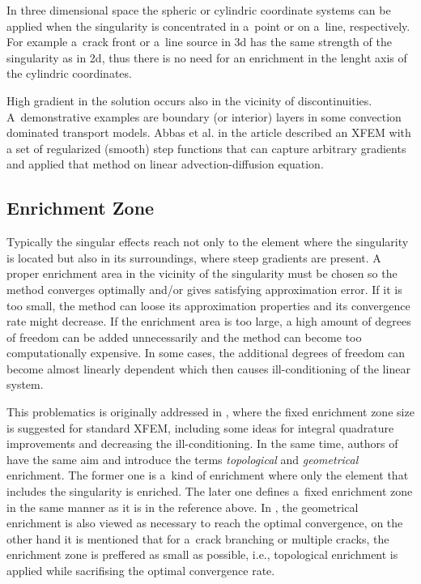 In three dimensional space the spheric or cylindric coordinate systems can be applied when the singularity is concentrated in a~point or on a~line, respectively.
For example a~crack front or a~line source in 3d has the same strength of the singularity as in 2d, thus there is no need for an enrichment in the lenght axis
of the cylindric coordinates.

High gradient in the solution occurs also in the vicinity of discontinuities. A~demonstrative examples are boundary (or interior) layers
in some convection dominated transport models. Abbas et al. in the article \cite{abbas_alizada_fries_highgradient_2010} described an XFEM with
a set of regularized (smooth) step functions that can capture arbitrary gradients and applied that method on linear advection-diffusion equation.

\subsection{Enrichment Zone} \label{sec:glob_enr_zone}
Typically the singular effects reach not only to the element where the singularity is located but also in its surroundings,
where steep gradients are present.
A proper enrichment area in the vicinity of the singularity must be chosen so the method converges optimally
and/or gives satisfying approximation error. If it is too
small, the method can loose its approximation properties and its convergence rate might decrease. If the enrichment area is too large,
a high amount of degrees of freedom can be added unnecessarily and the method can become too computationally expensive.
In some cases, the additional degrees of freedom can become almost linearly dependent which then causes ill-conditioning of the linear system.

This problematics is originally addressed in \cite{laborde_highorder_2005}, where the fixed enrichment zone size is suggested for standard XFEM,
including some ideas for integral quadrature improvements and decreasing the ill-conditioning. In the same time, authors of \cite{bechet_improved_2005}
have the same aim and introduce the terms \emph{topological} and \emph{geometrical} enrichment. The former one is a~kind of enrichment where only the element
that includes the singularity is enriched. The later one defines a~fixed enrichment zone in the same manner as it is in the reference above.
In \cite{fries_corrected_2008}, the geometrical enrichment is also viewed as necessary to reach the optimal convergence, on the other hand
it is mentioned that for a~crack branching or multiple cracks, the enrichment zone is preffered as small as possible, i.e., topological enrichment is applied
while sacrifising the optimal convergence rate.

